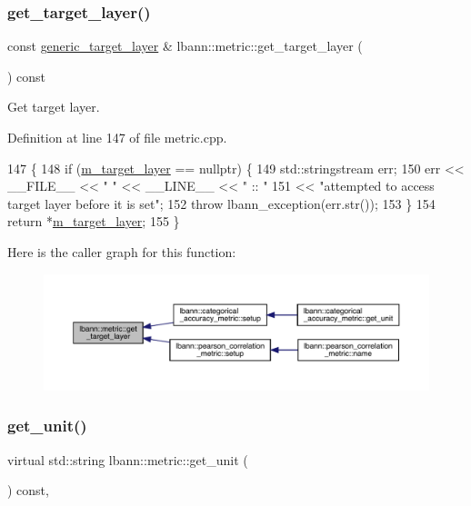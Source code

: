 \subsubsection{\texorpdfstring{get\+\_\+target\+\_\+layer()}{get\_target\_layer()}}
{\footnotesize\ttfamily const \hyperlink{classlbann_1_1generic__target__layer}{generic\+\_\+target\+\_\+layer} \& lbann\+::metric\+::get\+\_\+target\+\_\+layer (\begin{DoxyParamCaption}{ }\end{DoxyParamCaption}) const}

Get target layer. 

Definition at line 147 of file metric.\+cpp.


\begin{DoxyCode}
147                                                            \{
148   \textcolor{keywordflow}{if} (\hyperlink{classlbann_1_1metric_a2bf6c53efb1b525bfa63a8c3167968d9}{m\_target\_layer} == \textcolor{keyword}{nullptr}) \{
149     std::stringstream err;
150     err << \_\_FILE\_\_ << \textcolor{stringliteral}{" "} << \_\_LINE\_\_ << \textcolor{stringliteral}{" :: "}
151         << \textcolor{stringliteral}{"attempted to access target layer before it is set"};
152     \textcolor{keywordflow}{throw} lbann\_exception(err.str());
153   \}
154   \textcolor{keywordflow}{return} *\hyperlink{classlbann_1_1metric_a2bf6c53efb1b525bfa63a8c3167968d9}{m\_target\_layer};
155 \}
\end{DoxyCode}
Here is the caller graph for this function\+:\nopagebreak
\begin{figure}[H]
\begin{center}
\leavevmode
\includegraphics[width=350pt]{classlbann_1_1metric_aba7f7a12aeba6619f7b4330e9075f76e_icgraph}
\end{center}
\end{figure}
\mbox{\label{classlbann_1_1metric_a13fd302dec85190b877f7146529e516c}} 
\subsubsection{\texorpdfstring{get\+\_\+unit()}{get\_unit()}}
{\footnotesize\ttfamily virtual std\+::string lbann\+::metric\+::get\+\_\+unit (\begin{DoxyParamCaption}{ }\end{DoxyParamCaption}) const\hspace{0.3cm}{\ttfamily [inline]}, {\ttfamily [virtual]}}

